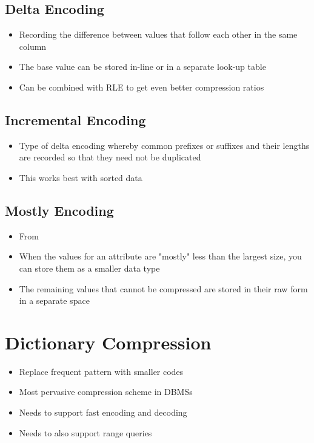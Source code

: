 \documentclass[11pt]{article}
\begin{document}
    \subsection*{Delta Encoding}
    \begin{itemize}
        \item Recording the difference between values that follow each other in the same column
        \item The base value can be stored in-line or in a separate look-up table
        \item Can be combined with RLE to get even better compression ratios
    \end{itemize}

    \subsection*{Incremental Encoding}
    \begin{itemize}
        \item Type of delta encoding whereby common prefixes or suffixes and their lengths are recorded so that they need not be duplicated
        \item This works best with sorted data
    \end{itemize}

    \subsection*{Mostly Encoding}
    \begin{itemize}
        \item From 
        \item When the values for an attribute are "mostly" less than the largest size, you can store them as a smaller data type
        \item The remaining values that cannot be compressed are stored in their raw form in a separate space
    \end{itemize}


\section{Dictionary Compression ~\cite{p283-binnig}}
\begin{itemize}
    \item Replace frequent pattern with smaller codes
    \item Most pervasive compression scheme in DBMSs
    \item Needs to support fast encoding and decoding
    \item Needs to also support range queries
\end{itemize}
\end{document}
